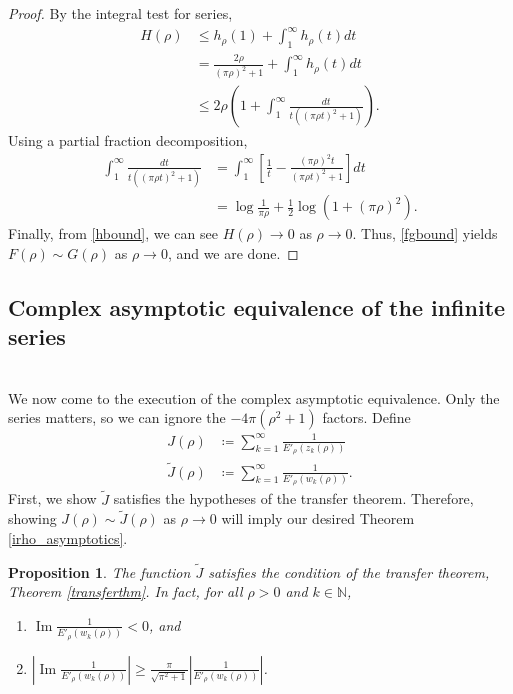 \documentclass{amsart}
\theoremstyle{plain}
\numberwithin{theorem}{section}
\newtheorem{prop}[theorem]{Proposition}
\DeclareMathOperator{\Imz}{Im}
\theoremstyle{definition}
\theoremstyle{remark}
\theoremstyle{brakets}
\newcommand{\N}{\mathbb{N}}
\begin{document}
\begin{proof}
By the integral test for series,
\begin{align}
H(\rho) &\leq h_\rho(1) + \int_1^{\infty} h_\rho(t)dt \nonumber\\ 
&= \frac{2\rho}{(\pi\rho)^2 + 1} + \int_1^{\infty} h_\rho(t)dt \nonumber\\ 
&\leq 2\rho\left(1  + \int_1^{\infty} \frac{dt}{t((\pi \rho t)^2 + 1)} \right). \label{hbound}
\end{align}
Using a partial fraction decomposition, 
\begin{align*}
    \int_1^{\infty} \frac{dt}{t((\pi \rho t)^2 + 1)} &= \int_{1}^{\infty} \left[ \frac{1}{t} - \frac{(\pi \rho)^2t}{(\pi\rho t)^2+ 1} \right]dt \\
    &= \log \frac{1}{\pi \rho} + \frac{1}{2}\log (1 + (\pi\rho)^2).
\end{align*}
Finally, from \eqref{hbound}, we can see $H(\rho) \to 0$ as $\rho \to 0$. Thus, \eqref{fgbound} yields $F(\rho) \sim G(\rho)$ as $\rho \to 0$, and we are done.
\end{proof}


\subsection{Complex asymptotic equivalence of the infinite series}
~\\
We now come to the execution of the complex asymptotic equivalence. Only the series matters, so we can ignore the $-4\pi(\rho^2 +1)$ factors. Define
\begin{align*}
    J(\rho)& \coloneq \sum\limits_{k=1}^\infty \frac{1}{E'_\rho(z_k(\rho))} \\
    \tilde{J}(\rho) &\coloneq \sum\limits_{k=1}^\infty \frac{1}{E'_\rho(w_k(\rho))}.
\end{align*}
First, we show $\tilde{J}$ satisfies the hypotheses of the transfer theorem. Therefore, showing $J(\rho) \sim \tilde{J}(\rho)$ as $\rho \to 0$ will imply our desired Theorem \ref{irho_asymptotics}.

\begin{prop}\label{jtildetransferthm}
The function $\tilde{J}$ satisfies the condition of the transfer theorem, Theorem \ref{transferthm}. In fact, for all $\rho > 0$ and $k \in \N$,
\begin{enumerate}
    \item $\Imz \frac{1}{E'_\rho(w_k(\rho))} < 0$, and
    \item $\left| \Imz \frac{1}{E'_\rho(w_k(\rho))} \right| \geq \frac{\pi}{\sqrt{\pi^2 + 1}} \left| \frac{1}{E'_\rho(w_k(\rho))} \right|$.
\end{enumerate}  
\end{prop}
\end{document}
